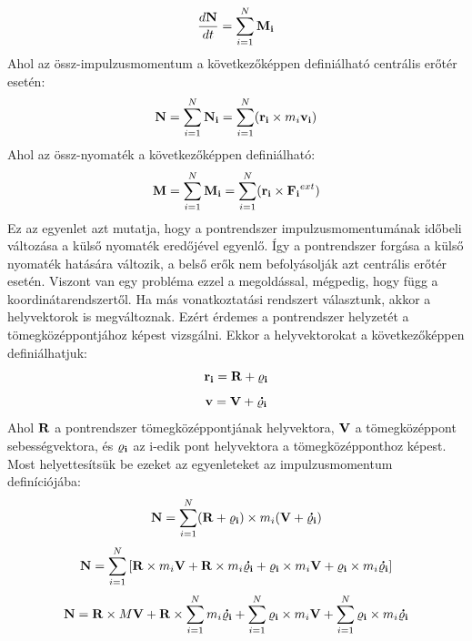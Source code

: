 \documentclass[a4paper,12pt]{article}
\begin{document}
\begin{equation}
    \frac{d\bold{N}}{dt} = \sum_{i=1}^{N} \bold{M_i}
\end{equation}
Ahol az össz-impulzusmomentum a következőképpen definiálható centrális erőtér esetén:
\begin{equation}
    \bold{N} = \sum_{i=1}^{N} \bold{N_i} = \sum_{i=1}^{N} (\bold{r_i} \times m_i \bold{v_i})
\end{equation}
Ahol az össz-nyomaték a következőképpen definiálható:
\begin{equation}
    \bold{M} = \sum_{i=1}^{N} \bold{M_i} = \sum_{i=1}^{N} (\bold{r_i} \times \bold{F_i}^{ext})
\end{equation}
Ez az egyenlet azt mutatja, hogy a pontrendszer impulzusmomentumának időbeli változása a külső nyomaték eredőjével egyenlő. Így a pontrendszer forgása a külső nyomaték hatására változik,
a belső erők nem befolyásolják azt centrális erőtér esetén. Viszont van egy probléma ezzel a megoldással, mégpedig, hogy függ a koordinátarendszertől. Ha más vonatkoztatási rendszert választunk,
akkor a helyvektorok is megváltoznak. Ezért érdemes a pontrendszer helyzetét a tömegközéppontjához képest vizsgálni. Ekkor a helyvektorokat a következőképpen definiálhatjuk:
\begin{equation}
    \bold{r_i} = \bold{R} + \bold{\varrho_i}
\end{equation}
\begin{equation}
    \bold{v} = \bold{V} + \bold{\dot{\varrho_i}}
\end{equation}
Ahol $\bold{R}$ a pontrendszer tömegközéppontjának helyvektora, $\bold{V}$ a tömegközéppont sebességvektora, és $\bold{\varrho_i}$ az i-edik pont helyvektora a tömegközépponthoz képest.
Most helyettesítsük be ezeket az egyenleteket az impulzusmomentum definíciójába:
\begin{equation}
    \bold{N} = \sum_{i=1}^{N} (\bold{R} + \bold{\varrho_i}) \times m_i (\bold{V} + \bold{\dot{\varrho_i}})
\end{equation}
\begin{equation}
    \bold{N} = \sum_{i=1}^{N} \left[\bold{R} \times m_i \bold{V} + \bold{R} \times m_i \bold{\dot{\varrho_i}} + \bold{\varrho_i} \times m_i \bold{V} + \bold{\varrho_i} \times m_i \bold{\dot{\varrho_i}}\right]
\end{equation}
\begin{equation}
    \bold{N} = \bold{R} \times M \bold{V} + \bold{R} \times \sum_{i=1}^{N} m_i \bold{\dot{\varrho_i}} + \sum_{i=1}^{N} \bold{\varrho_i} \times m_i \bold{V} + \sum_{i=1}^{N} \bold{\varrho_i} \times m_i \bold{\dot{\varrho_i}}
\end{equation}
\end{document}

